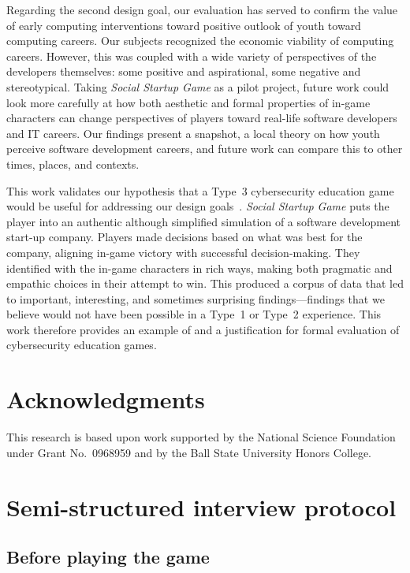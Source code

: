 \documentclass[letterpaper]{article}
\begin{document}
Regarding the second design goal, our evaluation has served to 
confirm the value of early computing interventions toward positive
outlook of youth toward computing careers.
Our subjects recognized the economic viability of computing careers.
However, this was coupled with a wide variety of perspectives
of the developers themselves: some positive and aspirational, some
negative and stereotypical.
Taking \textit{Social Startup Game} as a pilot project, future work
could look more carefully at how both aesthetic and formal properties
of in-game characters can change perspectives of players toward
real-life software developers and IT careers.
Our findings present a snapshot, a local theory on how youth perceive
software development careers, and future work can compare this to 
other times, places, and contexts.

This work validates our hypothesis that a Type~3 cybersecurity
education game would be useful for addressing our design
goals~\citep{Gestwicki2015}. 
\textit{Social Startup Game} puts the player into an authentic 
although simplified simulation of a software development start-up company.
Players made decisions based on what was best for the company, 
aligning in-game victory with successful decision-making.
They identified with the in-game characters in rich ways, making
both pragmatic and empathic choices in their attempt to win.
This produced a corpus of data that led to important, interesting, and
sometimes surprising findings---findings that we believe would not have
been possible in a Type~1 or Type~2 experience.
This work therefore provides an example of and a justification for
formal evaluation of cybersecurity education games. 


\section{Acknowledgments}

This research is based upon work supported by the National Science
Foundation under Grant No.~0968959 and by the Ball State University
Honors College.





\clearpage
\appendix
\section{Semi-structured interview protocol}
\label{appendix:interview-protocol}

\subsection*{Before playing the game}
\end{document}
